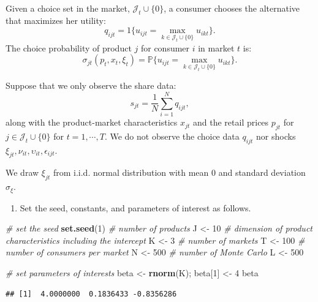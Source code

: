 \documentclass[]{book}
\newenvironment{Shaded}{\begin{snugshade}}{\end{snugshade}}
\newcommand{\KeywordTok}[1]{\textcolor[rgb]{0.13,0.29,0.53}{\textbf{#1}}}
\newcommand{\DecValTok}[1]{\textcolor[rgb]{0.00,0.00,0.81}{#1}}
\newcommand{\StringTok}[1]{\textcolor[rgb]{0.31,0.60,0.02}{#1}}
\newcommand{\CommentTok}[1]{\textcolor[rgb]{0.56,0.35,0.01}{\textit{#1}}}
\newcommand{\NormalTok}[1]{#1}
\providecommand{\tightlist}{%
  \setlength{\itemsep}{0pt}\setlength{\parskip}{0pt}}
\begin{document}
Given a choice set in the market, \(\mathcal{J}_t \cup \{0\}\), a
consumer chooses the alternative that maximizes her utility: \[
q_{ijt} = 1\{u_{ijt} = \max_{k \in \mathcal{J}_t \cup \{0\}} u_{ikt}\}.
\] The choice probability of product \(j\) for consumer \(i\) in market
\(t\) is: \[
\sigma_{jt}(p_t, x_t, \xi_t) = \mathbb{P}\{u_{ijt} = \max_{k \in \mathcal{J}_t \cup \{0\}} u_{ikt}\}.
\]

Suppose that we only observe the share data: \[
s_{jt} = \frac{1}{N} \sum_{i = 1}^N q_{ijt},
\] along with the product-market characteristics \(x_{jt}\) and the
retail prices \(p_{jt}\) for \(j \in \mathcal{J}_t \cup \{0\}\) for
\(t = 1, \cdots, T\). We do not observe the choice data \(q_{ijt}\) nor
shocks \(\xi_{jt}, \nu_{it}, \upsilon_{it}, \epsilon_{ijt}\).

We draw \(\xi_{jt}\) from i.i.d. normal distribution with mean 0 and
standard deviation \(\sigma_{\xi}\).

\begin{enumerate}
\def\labelenumi{\arabic{enumi}.}
\tightlist
\item
  Set the seed, constants, and parameters of interest as follows.
\end{enumerate}

\begin{Shaded}
\begin{Highlighting}[]
\CommentTok{# set the seed}
\KeywordTok{set.seed}\NormalTok{(}\DecValTok{1}\NormalTok{)}
\CommentTok{# number of products}
\NormalTok{J <-}\StringTok{ }\DecValTok{10}
\CommentTok{# dimension of product characteristics including the intercept}
\NormalTok{K <-}\StringTok{ }\DecValTok{3}
\CommentTok{# number of markets}
\NormalTok{T <-}\StringTok{ }\DecValTok{100}
\CommentTok{# number of consumers per market}
\NormalTok{N <-}\StringTok{ }\DecValTok{500}
\CommentTok{# number of Monte Carlo}
\NormalTok{L <-}\StringTok{ }\DecValTok{500}
\end{Highlighting}
\end{Shaded}

\begin{Shaded}
\begin{Highlighting}[]
\CommentTok{# set parameters of interests}
\NormalTok{beta <-}\StringTok{ }\KeywordTok{rnorm}\NormalTok{(K); }
\NormalTok{beta[}\DecValTok{1}\NormalTok{] <-}\StringTok{ }\DecValTok{4}
\NormalTok{beta}
\end{Highlighting}
\end{Shaded}

\begin{verbatim}
## [1]  4.0000000  0.1836433 -0.8356286
\end{verbatim}
\end{document}
